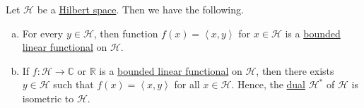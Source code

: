 \begin{theorem}\label{thm:Riesz-representation}
	Let \(\mathcal{H} \) be a \hyperref[def:Hilbert-space]{Hilbert space}. Then we have the following.
	\begin{enumerate}[(a)]
		\item For every \(y\in \mathcal{H} \), then function \(f(x) = \left\langle x, y \right\rangle \) for \(x\in \mathcal{H} \) is a \hyperref[def:bounded-linear-functional]{bounded linear functional} on \(\mathcal{H} \).
		\item If \(f\colon \mathcal{H} \to \mathbb{C} \) or \(\mathbb{R} \) is a \hyperref[def:bounded-linear-functional]{bounded linear functional} on \(\mathcal{H} \), then there exists \(y\in \mathcal{H} \) such that \(f(x) = \left\langle x,y \right\rangle \) for all \(x\in \mathcal{H} \). Hence, the \hyperref[def:dual-space]{dual} \(\mathcal{H} ^{\ast} \) of \(\mathcal{H} \) is isometric to \(\mathcal{H} \).
	\end{enumerate}
\end{theorem}
